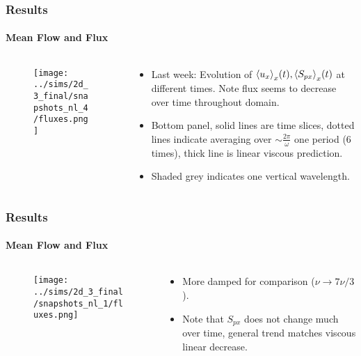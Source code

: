 \documentclass[dvipsnames]{beamer}
\DeclarePairedDelimiter\ev{\langle}{\rangle}
\begin{document}
\begin{frame}
    \frametitle{Results}
    \framesubtitle{Mean Flow and Flux}

    \begin{columns}
        \begin{column}{0.5\textwidth}
            \begin{figure}[t]
                \centering
                \texttt{[image: ../sims/2d\_3\_final/snapshots\_nl\_4/fluxes.png]}
            \end{figure}
        \end{column}
        \begin{column}{0.5\textwidth}
            \begin{itemize}
                \item Last week: Evolution of $\ev*{u_x}_x(t),
                    \ev*{S_{px}}_x(t)$ at different times. Note flux seems to
                    decrease over time throughout domain.

                \item Bottom panel, solid lines are time slices, dotted lines
                    indicate averaging over $\sim \frac{2\pi}{\omega}$ one
                    period (6 times), thick line is linear viscous prediction.

                \item Shaded grey indicates one vertical wavelength.
            \end{itemize}
        \end{column}
    \end{columns}
\end{frame}

\begin{frame}
    \frametitle{Results}
    \framesubtitle{Mean Flow and Flux}

    \begin{columns}
        \begin{column}{0.5\textwidth}
            \begin{figure}[t]
                \centering
                \texttt{[image: ../sims/2d\_3\_final/snapshots\_nl\_1/fluxes.png]}
            \end{figure}
        \end{column}
        \begin{column}{0.5\textwidth}
            \begin{itemize}
                \item More damped for comparison ($\nu \to 7\nu/3$).

                \item Note that $S_{px}$ does not change much over time, general
                    trend matches viscous linear decrease.
            \end{itemize}
        \end{column}
    \end{columns}
\end{frame}
\end{document}
